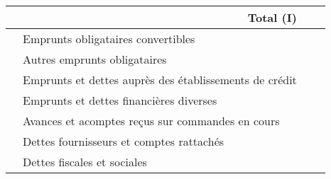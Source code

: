 \begin{table}[h]
\begin{tabular}{|l|p{6cm}|c|c|}
                                                                                              &  \multicolumn{1}{r|}{\textbf{Total (I)}}        &     &   \\ 
\hline
\parbox[t]{2mm}{} & Emprunts obligataires convertibles	                                   &     &   \\ 
                                                                                              & Autres emprunts obligataires	                                  &     &   \\ 
                                                                                              & Emprunts et dettes auprès des établissements de crédit                                          &     &   \\ 
                                                                                              & Emprunts et dettes financières diverses                               &     &   \\ 
                                                                                              & Avances et acomptes reçus sur commandes en cours                         &     &   \\ 
                                                                                              &  Dettes fournisseurs et comptes rattachés                                   &     &   \\ 
                                                                                              & Dettes fiscales et sociales                                               &     &   \\ 

\end{tabular}
\end{table}
